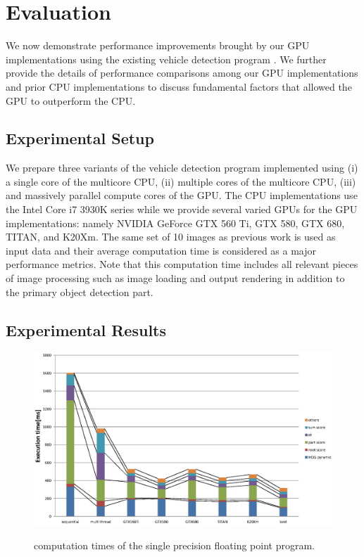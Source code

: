 \section{Evaluation}
\label{sec:evaluation}

We now demonstrate performance improvements brought by our GPU
implementations using the existing vehicle detection program
\cite{Niknejad12}.
We further provide the details of performance comparisons among our GPU
implementations and prior CPU implementations to discuss fundamental
factors that allowed the GPU to outperform the CPU.

\subsection{Experimental Setup}
\label{sec:setup}

We prepare three variants of the vehicle detection program implemented
using (i) a single core of the multicore CPU, (ii) multiple cores of the
multicore CPU, (iii) and massively parallel compute cores of the GPU.
The CPU implementations use the Intel Core i7 3930K series while we
provide several varied GPUs for the GPU implementations: namely NVIDIA
GeForce GTX 560 Ti, GTX 580, GTX 680, TITAN, and K20Xm.
The same set of 10 images as previous work \cite{Niknejad12} is used as
input data and their average computation time is considered as a major
performance metrics.
Note that this computation time includes all relevant pieces of image
processing such as image loading and output rendering in addition to the
primary object detection part.

\subsection{Experimental Results}
\label{sec:results}

\begin{figure}[t]
 \begin{center}
  \includegraphics[width=\hsize]{fig/float_exe_time.eps}\\
  \caption{computation times of the single precision floating point program.}
  \label{fig:float_exe_time}
 \end{center}
\end{figure}

